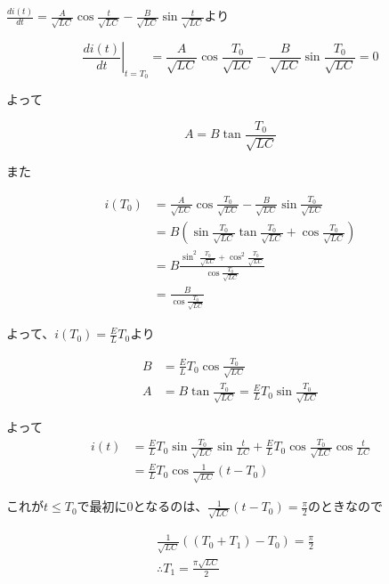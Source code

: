 \documentclass[a4paper,12pt,xelatex,ja=standard]{bxjsarticle}
\begin{document}
\(\frac{di(t)}{dt} = \frac{A}{\sqrt{LC}}\cos \frac{t}{\sqrt{LC}} - \frac{B}{\sqrt{LC}} \sin \frac{t}{\sqrt{LC}}\)より

\[
  \left.\frac{di(t)}{dt}\right|_{t=T_0} = \frac{A}{\sqrt{LC}}\cos \frac{T_0}{\sqrt{LC}} - \frac{B}{\sqrt{LC}} \sin \frac{T_0}{\sqrt{LC}} = 0
\]

よって

\[
  A = B \tan \frac{T_0}{\sqrt{LC}}
\]

また

\begin{equation*}
  \begin{split}
    i(T_0)
    &= \frac{A}{\sqrt{LC}}\cos \frac{T_0}{\sqrt{LC}} - \frac{B}{\sqrt{LC}} \sin \frac{T_0}{\sqrt{LC}} \\
    &= B \left( \sin{\frac{T_0}{\sqrt{LC}}} \tan{\frac{T_0}{\sqrt{LC}}} + \cos{\frac{T_0}{\sqrt{LC}}} \right) \\
    &= B \frac{\sin^2{\frac{T_0}{\sqrt{LC}}} + \cos^2{\frac{T_0}{\sqrt{LC}}}}{\cos{\frac{T_0}{\sqrt{LC}}}} \\
    &= \frac{B}{\cos{\frac{T_0}{\sqrt{LC}}}}
  \end{split}
\end{equation*}

よって、\(i(T_0) = \frac{E}{L}T_0\)より

\begin{equation*}
  \begin{split}
    B &= \frac{E}{L}T_0 \cos{\frac{T_0}{\sqrt{LC}}} \\
    A &= B \tan{\frac{T_0}{\sqrt{LC}}} = \frac{E}{L} T_0 \sin{\frac{T_0}{\sqrt{LC}}}
  \end{split}
\end{equation*}

よって
\begin{equation*}
  \begin{split}
    i(t)
      &= \frac{E}{L} T_0 \sin{\frac{T_0}{\sqrt{LC}}} \sin{\frac{t}{LC}} + \frac{E}{L} T_0 \cos{\frac{T_0}{\sqrt{LC}}} \cos{\frac{t}{LC}}\\
      &= \frac{E}{L} T_0 \cos{\frac{1}{\sqrt{LC}}} (t - T_0)
  \end{split}
\end{equation*}

これが\(t \leq T_0\)で最初に\(0\)となるのは、\(\frac{1}{\sqrt{LC}}(t - T_0) = \frac{\pi}{2}\)のときなので

\begin{equation*}
  \begin{split}
    &\frac{1}{\sqrt{LC}}((T_0 + T_1) - T_0) = \frac{\pi}{2} \\
    &\therefore T_1 = \frac{\pi \sqrt{LC}}{2}
  \end{split}
\end{equation*}
\end{document}
